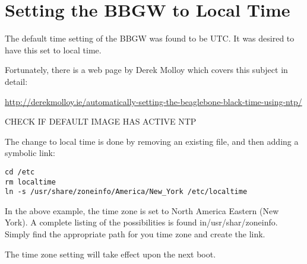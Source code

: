 \chapter{Setting the BBGW to Local Time}

The default time setting of the BBGW was found to be UTC.  It was desired to 
have this set to local time.

Fortunately, there is a web page by Derek Molloy which covers this subject in 
detail:

\url{http://derekmolloy.ie/automatically-setting-the-beaglebone-black-time-using-ntp/}

CHECK IF DEFAULT IMAGE HAS ACTIVE NTP

The change to local time is done by removing an existing file, and then adding 
a symbolic link:

\begin{verbatim}
cd /etc
rm localtime
ln -s /usr/share/zoneinfo/America/New_York /etc/localtime
\end{verbatim}

In the above example, the time zone is set to North America Eastern (New 
York).  A complete listing of the possibilities is found in/usr/shar/zoneinfo.
Simply find the appropriate path for you time zone and create the link.

The time zone setting will take effect upon the next boot.
